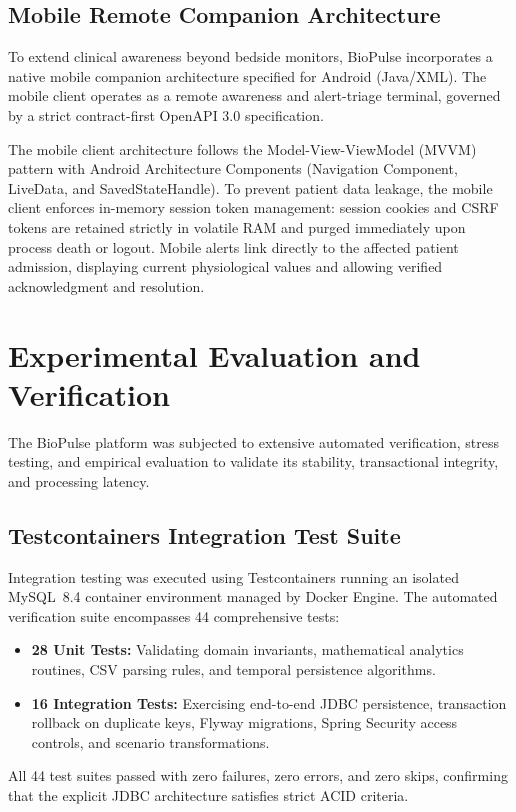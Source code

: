 \documentclass[10pt,journal,compsoc]{IEEEtran}
\begin{document}
\subsection{Mobile Remote Companion Architecture}
To extend clinical awareness beyond bedside monitors, BioPulse incorporates a native mobile companion architecture specified for Android (Java/XML). The mobile client operates as a remote awareness and alert-triage terminal, governed by a strict contract-first OpenAPI 3.0 specification.

The mobile client architecture follows the Model-View-ViewModel (MVVM) pattern with Android Architecture Components (Navigation Component, LiveData, and SavedStateHandle). To prevent patient data leakage, the mobile client enforces in-memory session token management: session cookies and CSRF tokens are retained strictly in volatile RAM and purged immediately upon process death or logout. Mobile alerts link directly to the affected patient admission, displaying current physiological values and allowing verified acknowledgment and resolution.

\section{Experimental Evaluation and Verification}
\label{sec:evaluation}

The BioPulse platform was subjected to extensive automated verification, stress testing, and empirical evaluation to validate its stability, transactional integrity, and processing latency.

\subsection{Testcontainers Integration Test Suite}
Integration testing was executed using Testcontainers running an isolated MySQL~8.4 container environment managed by Docker Engine. The automated verification suite encompasses 44 comprehensive tests:
\begin{itemize}
    \item \textbf{28 Unit Tests:} Validating domain invariants, mathematical analytics routines, CSV parsing rules, and temporal persistence algorithms.
    \item \textbf{16 Integration Tests:} Exercising end-to-end JDBC persistence, transaction rollback on duplicate keys, Flyway migrations, Spring Security access controls, and scenario transformations.
\end{itemize}
All 44 test suites passed with zero failures, zero errors, and zero skips, confirming that the explicit JDBC architecture satisfies strict ACID criteria.
\end{document}
